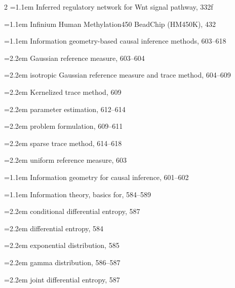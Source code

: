\begin{multicols}{2}
\noindent\hangindent=1.1em Inferred regulatory network for Wnt signal pathway, 332f\par
\noindent\hangindent=1.1em Infinium Human Methylation450 BeadChip (HM450K), 432\par
\noindent\hangindent=1.1em Information geometry-based causal inference methods, 603--618\par
\noindent\hangindent=2.2em \hspace*{1.1em}Gaussian reference measure, 603--604\par
\noindent\hangindent=2.2em \hspace*{1.1em}isotropic Gaussian reference measure and trace method, 604--609\par
\noindent\hangindent=2.2em \hspace*{1.1em}Kernelized trace method, 609\par
\noindent\hangindent=2.2em \hspace*{1.1em}parameter estimation, 612--614\par
\noindent\hangindent=2.2em \hspace*{1.1em}problem formulation, 609--611\par
\noindent\hangindent=2.2em \hspace*{1.1em}sparse trace method, 614--618\par
\noindent\hangindent=2.2em \hspace*{1.1em}uniform reference measure, 603\par
\noindent\hangindent=1.1em Information geometry for causal inference, 601--602\par
\noindent\hangindent=1.1em Information theory, basics for, 584--589\par
\noindent\hangindent=2.2em \hspace*{1.1em}conditional differential entropy, 587\par
\noindent\hangindent=2.2em \hspace*{1.1em}differential entropy, 584\par
\noindent\hangindent=2.2em \hspace*{1.1em}exponential distribution, 585\par
\noindent\hangindent=2.2em \hspace*{1.1em}gamma distribution, 586--587\par
\noindent\hangindent=2.2em \hspace*{1.1em}joint differential entropy, 587\par

\end{multicols}
